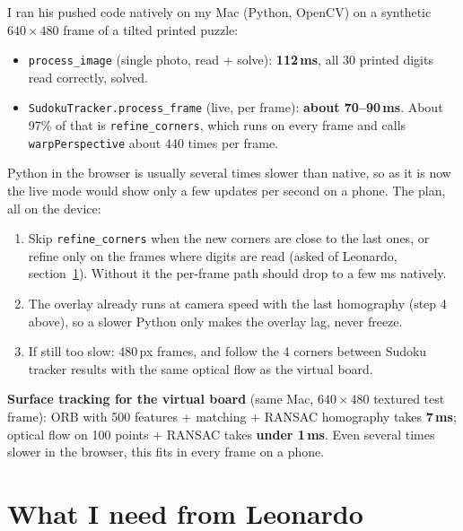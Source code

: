\documentclass[11pt]{article}
\begin{document}
I ran his pushed code natively on my Mac (Python, OpenCV) on a synthetic $640\times480$ frame of a
tilted printed puzzle:
\begin{itemize}
  \item \texttt{process\_image} (single photo, read + solve): \textbf{112\,ms}, all 30 printed
        digits read correctly, solved.
  \item \texttt{SudokuTracker.process\_frame} (live, per frame): \textbf{about 70--90\,ms}. About
        97\% of that is \texttt{refine\_corners}, which runs on every frame and calls
        \texttt{warpPerspective} about 440 times per frame.
\end{itemize}
Python in the browser is usually several times slower than native, so as it is now the live mode
would show only a few updates per second on a phone. The plan, all on the device:
\begin{enumerate}
  \item Skip \texttt{refine\_corners} when the new corners are close to the last ones, or refine
        only on the frames where digits are read (asked of Leonardo, section~\ref{sec:leo}). Without it the
        per-frame path should drop to a few ms natively.
  \item The overlay already runs at camera speed with the last homography (step 4 above), so a
        slower Python only makes the overlay lag, never freeze.
  \item If still too slow: 480\,px frames, and follow the 4 corners between Sudoku tracker results
        with the same optical flow as the virtual board.
\end{enumerate}
\textbf{Surface tracking for the virtual board} (same Mac, $640\times480$ textured test frame):
ORB with 500 features + matching + RANSAC homography takes \textbf{7\,ms}; optical flow on 100
points + RANSAC takes \textbf{under 1\,ms}. Even several times slower in the browser, this fits in
every frame on a phone.

\section{What I need from Leonardo}\label{sec:leo}
\end{document}
